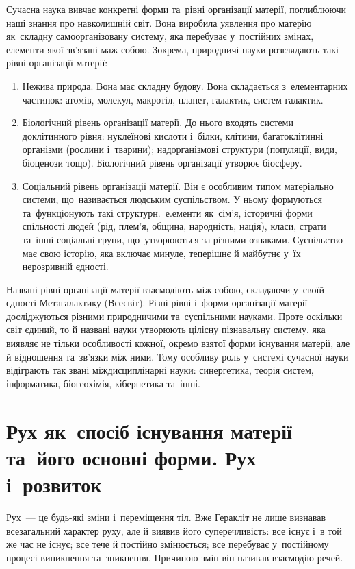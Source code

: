 \documentclass[a5paper,oneside,DIV=12,12pt,headings=small]{scrartcl}
\begin{document}
		Сучасна наука вивчає конкретні форми та~рівні організації матерії, поглиблюючи наші знання про навколишній світ. Вона виробила уявлення про матерію як~складну самоорганізовану систему, яка перебуває у~постійних змінах, елементи якої зв'я\-за\-ні маж собою. Зокрема, природничі науки розглядають такі рівні організації матерії:
		\begin{enumerate}
			\item Нежива природа. Вона має складну будову. Вона складається з~елементарних частинок: атомів, молекул, макротіл, планет, галактик, систем галактик.
			\item Біологічний рівень організації матерії. До нього входять системи доклітинного рівня: нуклеїнові кислоти і~білки, клітини, багатоклітинні організми (рослини і~тварини); надорганізмові структури (популяції, види, біоценози тощо). Біологічний рівень організації утворює біосферу.
			\item Соціальний рівень організації матерії. Він є особливим типом матеріально системи, що~називається людським суспільством. У ньому формуються та~функціонують такі структурн.~е.ементи як~сім'я, історичні форми спільності людей (рід, плем'я, община, народність, нація), класи, страти та~інші соціальні групи, що~утворюються за різними ознаками. Суспільство має свою історію, яка включає минуле, теперішнє й майбутнє у~їх нерозривній єдності.
		\end{enumerate}
		
		Названі рівні організації матерії взаємодіють між собою, складаючи у~своїй єдності Метагалактику (Всесвіт). Різні рівні і~форми організації матерії досліджуються різними природничими та~суспільними науками. Проте оскільки світ єдиний, то й названі науки утворюють цілісну пізнавальну систему, яка виявляє не тільки особливості кожної, окремо взятої форми існування матерії, але й відношення та~зв'яз\-ки між ними. Тому особливу роль у~системі сучасної науки відіграють так звані міждисциплінарні науки: синергетика, теорія систем, інформатика, біогеохімія, кібернетика та~інші.


	\section{Рух як~спосіб існування матерії та~його основні форми. Рух і~розвиток}
		Рух~— це будь-які зміни і~переміщення тіл. Вже Геракліт не лише визнавав всезагальний характер руху, але й виявив його суперечливість: все існує і~в той же час не існує; все тече й постійно змінюється; все перебуває у~постійному процесі виникнення та~зникнення. Причиною змін він називав взаємодію речей.
		
\end{document}
